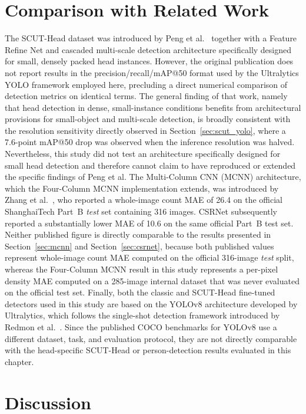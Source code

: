 \documentclass[12pt,a4paper]{report}
\begin{document}
\section{Comparison with Related Work}
\label{sec:related_work}

The SCUT-Head dataset was introduced by Peng et al.~\cite{peng2018scuthead} together with a Feature Refine Net and cascaded multi-scale detection architecture specifically designed for small, densely packed head instances. However, the original publication does not report results in the precision/recall/mAP@50 format used by the Ultralytics YOLO framework employed here, precluding a direct numerical comparison of detection metrics on identical terms. The general finding of that work, namely that head detection in dense, small-instance conditions benefits from architectural provisions for small-object and multi-scale detection, is broadly consistent with the resolution sensitivity directly observed in Section~\ref{sec:scut_yolo}, where a 7.6-point mAP@50 drop was observed when the inference resolution was halved. Nevertheless, this study did not test an architecture specifically designed for small head detection and therefore cannot claim to have reproduced or extended the specific findings of Peng et al. The Multi-Column CNN (MCNN) architecture, which the Four-Column MCNN implementation extends, was introduced by Zhang et al.~\cite{Zhang2016}, who reported a whole-image count MAE of 26.4 on the official ShanghaiTech Part~B \emph{test} set containing 316 images. CSRNet subsequently reported a substantially lower MAE of 10.6 on the same official Part~B test set. Neither published figure is directly comparable to the results presented in Section~\ref{sec:mcnn} and Section~\ref{sec:csrnet}, because both published values represent whole-image count MAE computed on the official 316-image \emph{test} split, whereas the Four-Column MCNN result in this study represents a per-pixel density MAE computed on a 285-image internal dataset that was never evaluated on the official test set. Finally, both the classic and SCUT-Head fine-tuned detectors used in this study are based on the YOLOv8 architecture developed by Ultralytics, which follows the single-shot detection framework introduced by Redmon et al.~\cite{redmon2016yolo}. Since the published COCO benchmarks for YOLOv8 use a different dataset, task, and evaluation protocol, they are not directly comparable with the head-specific SCUT-Head or person-detection results evaluated in this chapter.

\section{Discussion}
\label{sec:discussion}
\end{document}

